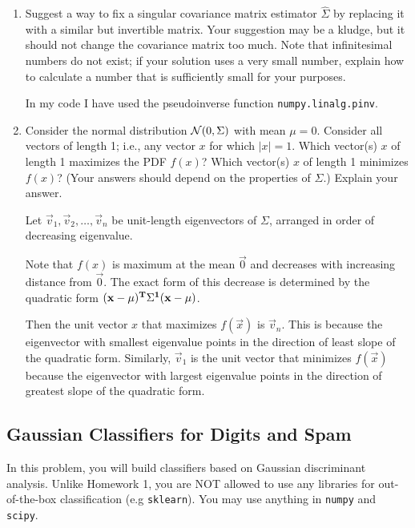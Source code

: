 \begin{enumerate}[label=(\alph*)]
\begin{mdframed}
    \end{mdframed}

  \item Suggest a way to fix a singular covariance matrix estimator
    $\hat{\Sigma}$ by replacing it with a similar but invertible matrix. Your
    suggestion may be a kludge, but it should not change the covariance matrix
    too much. Note that infinitesimal numbers do not exist; if your solution
    uses a very small number, explain how to calculate a number that is
    sufficiently small for your purposes.
    \begin{mdframed}
      In my code I have used the pseudoinverse function
      \texttt{numpy.linalg.pinv}.
    \end{mdframed}

  \item Consider the normal distribution $\mathcal{N}(0, \Sigma)$ with mean $\mu =
    0$. Consider all vectors of length 1; i.e., any vector $x$ for which
    $|x| =1$. Which vector(s) $x$ of length 1 maximizes the PDF $f(x)$? Which
    vector(s) $x$ of length 1 minimizes $f(x)$? (Your answers should depend on
    the properties of $\Sigma$.) Explain your answer.
    \begin{mdframed}
      Let $\vec v_1, \vec v_2, \ldots, \vec v_n$ be unit-length eigenvectors of
      $\Sigma$, arranged in order of decreasing eigenvalue.

      Note that $f(x)$ is maximum at the mean $\vec 0$ and decreases with
      increasing distance from $\vec 0$. The exact form of this decrease is
      determined by the quadratic form
      $(\mathbf x - \mu)^{\mathbf{T}}\Sigma^{\mathbf 1} (\mathbf x - \mu)$.

      Then the unit vector $x$ that maximizes $f(\vec x)$ is $\vec v_n$. This
      is because the eigenvector with smallest eigenvalue points in the
      direction of least slope of the quadratic form. Similarly, $\vec v_1$ is
      the unit vector that minimizes $f(\vec x)$ because the eigenvector with
      largest eigenvalue points in the direction of greatest slope of the
      quadratic form.
    \end{mdframed}
\end{enumerate}

\newpage
\subsection{Gaussian Classifiers for Digits and Spam}
In this problem, you will build classifiers based on Gaussian discriminant analysis. Unlike Homework 1, you are NOT allowed to use any libraries for out-of-the-box classification (e.g \texttt{sklearn}). You may use anything in \texttt{numpy} and \texttt{scipy}. \\

